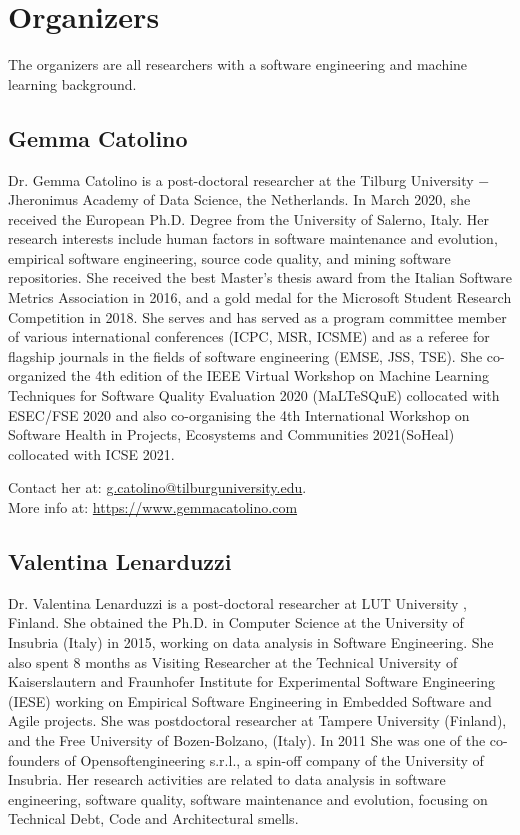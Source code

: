 
\section{Organizers}

The organizers are all researchers with a software engineering and machine learning background.

\label{sec:organizers}
\subsection{Gemma Catolino}
Dr. Gemma Catolino is a post-doctoral researcher at the Tilburg University $-$ Jheronimus Academy of Data Science, the Netherlands.
In March 2020, she received the European Ph.D. Degree from the University of Salerno, Italy. Her research interests include human factors in software maintenance and evolution, empirical software engineering, source code quality, and mining software repositories.
She received the best Master's thesis award from the Italian Software Metrics Association in 2016, and a gold medal for the Microsoft Student Research Competition in 2018. She serves and has served as a program committee member of various international conferences (ICPC, MSR, ICSME) and as a referee for flagship journals in the fields of software engineering (EMSE, JSS, TSE). She co-organized the 4th edition of the IEEE Virtual Workshop on Machine Learning Techniques for Software Quality Evaluation 2020 (MaLTeSQuE) collocated with ESEC/FSE 2020 and also co-organising the 4th International Workshop on Software Health in Projects, Ecosystems and Communities 2021(SoHeal) collocated with ICSE 2021.

\medskip
\noindent Contact her at: \href{mailto:g.catolino@tilburguniversity.edu}{g.catolino@tilburguniversity.edu}.\\
More info at: \url{https://www.gemmacatolino.com}

\subsection{Valentina Lenarduzzi}
Dr. Valentina Lenarduzzi is a post-doctoral researcher at LUT University , Finland. 
She obtained the Ph.D. in Computer Science at the University of Insubria (Italy) in 2015, working on data analysis in Software Engineering. She also spent 8 months as Visiting Researcher at the Technical University of Kaiserslautern and Fraunhofer Institute for Experimental Software Engineering (IESE) working on Empirical Software Engineering in Embedded Software and Agile projects.
She was postdoctoral researcher at Tampere University (Finland), and the Free University of Bozen-Bolzano, (Italy). In 2011 She was one of the co-founders of Opensoftengineering s.r.l., a spin-off company of the University of Insubria.
Her research activities are related to data analysis in software engineering, software quality, software maintenance and evolution, focusing on Technical Debt, Code and Architectural smells. 

